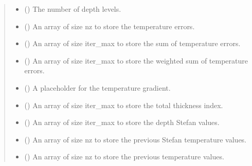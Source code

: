 \documentclass[a4paper,11pt,english,openany]{sphinxmanual}
\begin{document}
\begin{fulllineitems}
\begin{fulllineitems}
\begin{quote}
\begin{description}
\begin{itemize}
\item {} 
\sphinxAtStartPar
{} () \textendash{} The number of depth levels.

\end{itemize}

\begin{itemize}
\item {} 
\sphinxAtStartPar
{} () \textendash{} An array of size nz to store the temperature errors.

\item {} 
\sphinxAtStartPar
{} () \textendash{} An array of size iter\_max to store the sum of temperature errors.

\item {} 
\sphinxAtStartPar
{} () \textendash{} An array of size iter\_max to store the weighted sum of temperature errors.

\item {} 
\sphinxAtStartPar
{} () \textendash{} A placeholder for the temperature gradient.

\item {} 
\sphinxAtStartPar
{} () \textendash{} An array of size iter\_max to store the total thickness index.

\item {} 
\sphinxAtStartPar
{} () \textendash{} An array of size iter\_max to store the depth Stefan values.

\item {} 
\sphinxAtStartPar
{} () \textendash{} An array of size nz to store the previous Stefan temperature values.

\item {} 
\sphinxAtStartPar
{} () \textendash{} An array of size nz to store the previous temperature values.


\end{itemize}
\end{description}
\end{quote}
\end{fulllineitems}
\end{fulllineitems}
\end{document}
